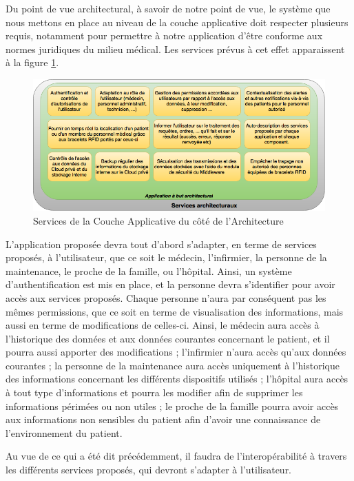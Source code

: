 Du point de vue architectural, à savoir de notre point de vue, le système que nous mettons en place au niveau de la couche applicative doit respecter plusieurs requis, notamment pour permettre à notre application d'être conforme aux normes juridiques du milieu médical. Les services prévus à cet effet apparaissent à la figure \ref{architecture}.
\\
\begin{figure}[h!]
	\hspace*{-2.5cm}
	\centering
	\includegraphics[width=1.4\textwidth]{architecture.png}
	\caption{Services de la Couche Applicative du côté de l'Architecture}
	\label{architecture}
\end{figure}

L'application proposée devra tout d'abord s’adapter, en terme de services proposés, à l’utilisateur, que ce soit le médecin, l'infirmier, la personne de la maintenance, le proche de la famille, ou l'hôpital. Ainsi, un système d’authentification est mis en place, et la personne devra s’identifier pour avoir accès aux services proposés. Chaque personne n’aura par conséquent pas les mêmes permissions, que ce soit en terme de visualisation des informations, mais aussi en terme de modifications de celles-ci. Ainsi, le médecin aura accès à l’historique des données et aux données courantes concernant le patient, et il pourra aussi apporter des modifications ; l’infirmier n’aura accès qu’aux données courantes ; la personne de la maintenance aura accès uniquement à l’historique des informations concernant les différents dispositifs utilisés ; l'hôpital aura accès à tout type d'informations et pourra les modifier afin de supprimer les informations périmées ou non utiles ; le proche de la famille pourra avoir accès aux informations non sensibles du patient afin d'avoir une connaissance de l'environnement du patient.

Au vue de ce qui a été dit précédemment, il faudra de l'interopérabilité à travers les différents services proposés, qui devront s'adapter à l'utilisateur.

